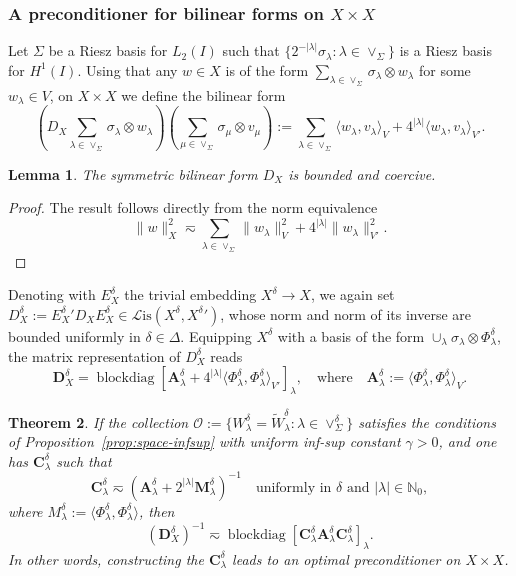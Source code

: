 \documentclass[11pt,a4paper,oneside,english]{amsart}
\numberwithin{equation}{section}
\newtheorem{theorem}{Theorem}
\numberwithin{theorem}{section}
\newtheorem{lemma}[theorem]{Lemma}
\theoremstyle{definition}
\newcommand{\N}{\mathbb{N}}
\DeclareMathOperator{\blockdiag}{blockdiag}
\newcommand{\la}{\langle}
\newcommand{\ra}{\rangle}
\newcommand{\cL}{\mathcal L}
\newcommand{\Lis}{\cL\mathrm{is}}
\newcommand{\jw}[1]{{\color{red}{JW: #1}}}
\begin{document}
\subsubsection{A preconditioner for bilinear forms on $X \times X$}
Let $\Sigma$ be a Riesz basis for $L_2(I)$ such that
$\{2^{-|\lambda|}\sigma_\lambda : \lambda \in \vee_\Sigma\}$ is a Riesz basis for $H^1(I)$.
Using that any $w \in X$ is of the form $\sum_{\lambda \in \vee_\Sigma} \sigma_\lambda \otimes w_\lambda$ for some $w_\lambda \in V$,
on $X \times X$ we define the bilinear form
\[
  (D_X \sum_{\lambda \in \vee_{\Sigma}} \sigma_\lambda \otimes w_\lambda)(\sum_{\mu \in \vee_{\Sigma}} \sigma_\mu \otimes v_\mu) := \sum_{\lambda \in \vee_\Sigma} \la w_\lambda, v_\lambda \ra_V + 4^{|\lambda|} \la w_\lambda, v_\lambda \ra_{V'}.
\]
\begin{lemma}
  The symmetric bilinear form $D_X$ is bounded and coercive.
\end{lemma}
\begin{proof}
  The result follows directly from the norm equivalence
  \[
    \|w\|_X^2 \eqsim \sum_{\lambda \in \vee_\Sigma} \|w_\lambda\|_V^2 + 4^{|\lambda|} \|w_\lambda\|_{V'}^2.
  \]
  \jw{TODO prove; hier kwamen we vorige keer niet netjes uit.}
\end{proof}
Denoting with $E_X^\delta$ the trivial embedding $X^\delta \to X$, we again set
$D_X^\delta := {E_X^\delta}' D_X E_X^\delta \in \Lis(X^\delta, {X^\delta}')$, whose
norm and norm of its inverse are bounded uniformly in $\delta \in \Delta$. Equipping
$X^\delta$ with a basis of the form $\cup_\lambda \sigma_\lambda \otimes \Phi_\lambda^\delta$,
the matrix representation of $D_X^\delta$ reads
\[
  \mathbf D_X^\delta = \blockdiag[\mathbf A_\lambda^\delta + 4^{|\lambda|} \la \Phi_\lambda^\delta, \Phi_\lambda^\delta \ra_{V'}]_\lambda, \quad \text{where} \quad \mathbf A_\lambda^\delta := \la \Phi_\lambda^\delta, \Phi_\lambda^\delta \ra_V.
\]
\begin{theorem}
If the collection $\mathcal O := \{W_\lambda^\delta = \tilde W_\lambda^\delta : \lambda \in \vee_\Sigma^\delta\}$
satisfies the conditions of Proposition~\ref{prop:space-infsup} with uniform inf-sup constant $\gamma>0$, and one has $\mathbf C_\lambda^\delta$ such that
\begin{equation}\label{eqn:robustmg}
    \mathbf C_\lambda^\delta \eqsim (\mathbf A_\lambda^\delta + 2^{|\lambda|} \mathbf M_\lambda^\delta)^{-1} \quad \text{uniformly in $\delta$ and $|\lambda|\in \N_0$},
\end{equation}
where $M_\lambda^\delta := \la \Phi_\lambda^\delta, \Phi_\lambda^\delta \ra$, then
\[
    (\mathbf D_X^\delta)^{-1} \eqsim \blockdiag[\mathbf C_\lambda^\delta \mathbf A_\lambda^\delta \mathbf C_\lambda^\delta]_\lambda.
\]
  In other words, constructing the $\mathbf C_\lambda^\delta$ leads to an optimal preconditioner on $X \times X$.
\end{theorem}
\end{document}
